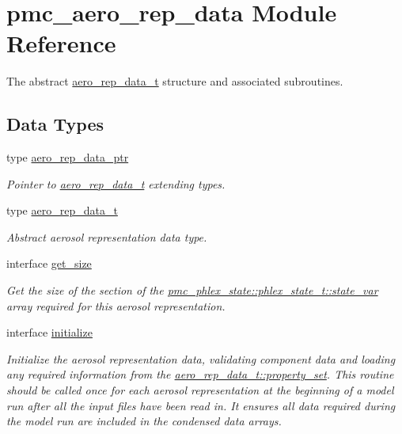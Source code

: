 \hypertarget{namespacepmc__aero__rep__data}{}\section{pmc\+\_\+aero\+\_\+rep\+\_\+data Module Reference}
\label{namespacepmc__aero__rep__data}


The abstract \mbox{\hyperlink{structpmc__aero__rep__data_1_1aero__rep__data__t}{aero\+\_\+rep\+\_\+data\+\_\+t}} structure and associated subroutines.  


\subsection*{Data Types}
\begin{DoxyCompactItemize}
\item 
type \mbox{\hyperlink{structpmc__aero__rep__data_1_1aero__rep__data__ptr}{aero\+\_\+rep\+\_\+data\+\_\+ptr}}
\begin{DoxyCompactList}\small\item\em Pointer to \mbox{\hyperlink{structpmc__aero__rep__data_1_1aero__rep__data__t}{aero\+\_\+rep\+\_\+data\+\_\+t}} extending types. \end{DoxyCompactList}\item 
type \mbox{\hyperlink{structpmc__aero__rep__data_1_1aero__rep__data__t}{aero\+\_\+rep\+\_\+data\+\_\+t}}
\begin{DoxyCompactList}\small\item\em Abstract aerosol representation data type. \end{DoxyCompactList}\item 
interface \mbox{\hyperlink{interfacepmc__aero__rep__data_1_1get__size}{get\+\_\+size}}
\begin{DoxyCompactList}\small\item\em Get the size of the section of the {\ttfamily \mbox{\hyperlink{structpmc__phlex__state_1_1phlex__state__t_a78835cb552d483ebbfc7a6bc6f756918}{pmc\+\_\+phlex\+\_\+state\+::phlex\+\_\+state\+\_\+t\+::state\+\_\+var}}} array required for this aerosol representation. \end{DoxyCompactList}\item 
interface \mbox{\hyperlink{interfacepmc__aero__rep__data_1_1initialize}{initialize}}
\begin{DoxyCompactList}\small\item\em Initialize the aerosol representation data, validating component data and loading any required information from the {\ttfamily \mbox{\hyperlink{structpmc__aero__rep__data_1_1aero__rep__data__t_a87b1bf5cd10a0a2b51390fb24ebf56c5}{aero\+\_\+rep\+\_\+data\+\_\+t\+::property\+\_\+set}}}. This routine should be called once for each aerosol representation at the beginning of a model run after all the input files have been read in. It ensures all data required during the model run are included in the condensed data arrays. \end{DoxyCompactList}\item 

\end{DoxyCompactItemize}
